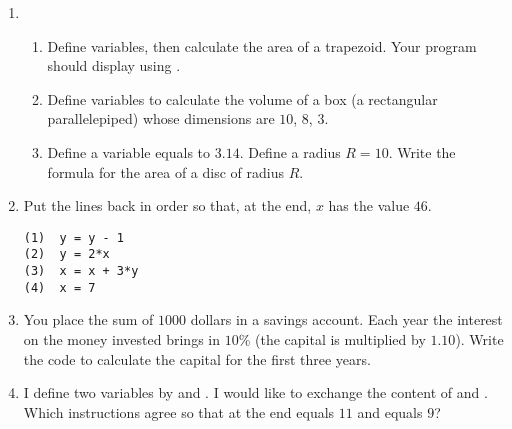 \documentclass[11pt,class=report,crop=false]{standalone}
\begin{document}

\begin{activite}[Variables]


\begin{enumerate}
  \item 
  \begin{enumerate}
    \item Define variables, then calculate the area of a trapezoid. 
  Your program should display  using .


    
    \item Define variables to calculate the volume of a box (a rectangular parallelepiped) whose dimensions are $10$, $8$, $3$.
    
    \item Define a variable  equals to $3.14$. Define a radius $R = 10$. Write the formula for the area of a disc of radius $R$.

\end{enumerate}    

  
  \item Put the lines back in order so that, at the end, $x$ has the value $46$.
\begin{center}
\begin{minipage}{0.5\textwidth}
\begin{lstlisting}  
(1)  y = y - 1
(2)  y = 2*x
(3)  x = x + 3*y     
(4)  x = 7
\end{lstlisting}
\end{minipage}
\end{center}  
  
  \item You place the sum of $1000$ dollars in a savings account. Each year the interest on the money invested brings in $10\%$ (the capital is multiplied by $1.10$).
  Write the code to calculate the capital for the first three years.

  \item I define two variables by  and . I would like to exchange the content of  and . Which instructions agree so that at the end  equals $11$ and  equals $9$?
  

\end{enumerate}
\end{activite}
\end{document}
